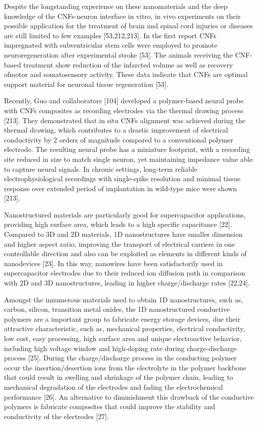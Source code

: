 Despite the longstanding experience on these nanomaterials and the deep knowledge of the CNFs-neuron interface in vitro, in vivo experiments on their possible application for the treatment of brain and spinal cord injuries or diseases are still limited to few examples [53,212,213]. In the first report CNFs impregnated with subventricular stem cells were employed to promote neuroregeneration after experimental stroke [53]. The animals receiving the CNF-based treatment show reduction of the infarcted volume as well as recovery ofmotor and somatosensory activity. These data indicate that CNFs are optimal support material for neuronal tissue regeneration [53].

Recently, Guo and collaborators [104] developed a polymer-based neural probe with CNFs composites as recording electrodes via the thermal drawing process [213]. They demonstrated that in situ CNFs alignment was achieved during the thermal drawing, which contributes to a drastic improvement of electrical conductivity by 2 orders of magnitude compared to a conventional polymer electrode. The resulting neural probe has a miniature footprint, with a recording site reduced in size to match single neuron, yet maintaining impedance value able to capture neural signals. In chronic settings, long-term reliable electrophysiological recordings with single-spike resolution and minimal tissue response over extended period of implantation in wild-type mice were shown [213].

Nanostructured materials are particularly good for supercapacitor applications, providing high surface area, which leads to a high specific capacitance [22]. Compared to 3D and 2D materials, 1D nanostructures have smaller dimension and higher aspect ratio, improving the transport of electrical carriers in one controllable direction and also can be exploited as elements in different kinds of nanodevices [23]. In this way, nanowires have been satisfactorily used in supercapacitor electrodes due to their reduced ion diffusion path in comparison with 2D and 3D nanostructures, leading in higher charge/discharge rates [22,24].

Amongst the innumerous materials used to obtain 1D nanostructures, such as, carbon, silicon, transition metal oxides, the 1D nanostructured conductive polymers are a important group to fabricate energy storage devices, due their attractive characteristic, such as, mechanical properties, electrical conductivity, low cost, easy processing, high surface area and unique electroactive behavior, including high voltage window and high-doping rate during charge-discharge process [25]. During the charge/discharge process in the conducting polymer occur the insertion/desertion ions from the electrolyte in the polymer backbone that could result in swelling and shrinkage of the polymer chain, leading to mechanical degradation of the electrodes and fading the electrochemical performance [26]. An alternative to diminishment this drawback of the conductive polymers is fabricate composites that could improve the stability and conductivity of the electrodes [27].

